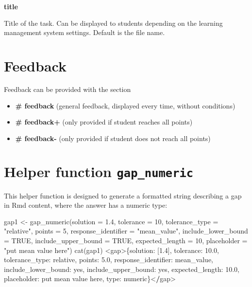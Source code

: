\documentclass[twoside]{tufte-book}
\newenvironment{Shaded}{}{}
\newcommand{\AttributeTok}[1]{\textcolor[rgb]{0.49,0.56,0.16}{#1}}
\newcommand{\ConstantTok}[1]{\textcolor[rgb]{0.53,0.00,0.00}{#1}}
\newcommand{\DecValTok}[1]{\textcolor[rgb]{0.25,0.63,0.44}{#1}}
\newcommand{\ErrorTok}[1]{\textcolor[rgb]{1.00,0.00,0.00}{\textbf{#1}}}
\newcommand{\FloatTok}[1]{\textcolor[rgb]{0.25,0.63,0.44}{#1}}
\newcommand{\FunctionTok}[1]{\textcolor[rgb]{0.02,0.16,0.49}{#1}}
\newcommand{\NormalTok}[1]{#1}
\newcommand{\OtherTok}[1]{\textcolor[rgb]{0.00,0.44,0.13}{#1}}
\newcommand{\SpecialCharTok}[1]{\textcolor[rgb]{0.25,0.44,0.63}{#1}}
\newcommand{\StringTok}[1]{\textcolor[rgb]{0.25,0.44,0.63}{#1}}
\providecommand{\tightlist}{%
  \setlength{\itemsep}{0pt}\setlength{\parskip}{0pt}}
\begin{document}
\noindent\textbf{title}\label{title-2}

Title of the task. Can be displayed to students depending on
the learning management system settings. Default is the file name.

\section{Feedback}\label{feedback-2}

Feedback can be provided with the section

\begin{itemize}
\tightlist
\item
  \textbf{\# feedback} (general feedback, displayed every time, without conditions)
\item
  \textbf{\# feedback+} (only provided if student reaches all points)
\item
  \textbf{\# feedback-} (only provided if student does not reach all points)
\end{itemize}

\section{\texorpdfstring{Helper function \texttt{gap\_numeric}}{Helper function gap\_numeric}}\label{gapnumeric}

This helper function is designed to generate a formatted string describing a gap in Rmd content, where the answer has a numeric type:

\begin{Shaded}
\begin{Highlighting}[]
\NormalTok{gap1 }\OtherTok{\textless{}{-}} \FunctionTok{gap\_numeric}\NormalTok{(}\AttributeTok{solution =} \FloatTok{1.4}\NormalTok{, }\AttributeTok{tolerance =} \DecValTok{10}\NormalTok{, }\AttributeTok{tolerance\_type =} \StringTok{"relative"}\NormalTok{,}
                    \AttributeTok{points =} \DecValTok{5}\NormalTok{, }\AttributeTok{response\_identifier =} \StringTok{"mean\_value"}\NormalTok{,}
                    \AttributeTok{include\_lower\_bound =} \ConstantTok{TRUE}\NormalTok{, }\AttributeTok{include\_upper\_bound =} \ConstantTok{TRUE}\NormalTok{,}
                    \AttributeTok{expected\_length =} \DecValTok{10}\NormalTok{, }\AttributeTok{placeholder =} \StringTok{"put mean value here"}\NormalTok{)}
\FunctionTok{cat}\NormalTok{(gap1)}
\SpecialCharTok{\textless{}}\NormalTok{gap}\SpecialCharTok{\textgreater{}}\NormalTok{\{solution}\SpecialCharTok{:}\NormalTok{ [}\FloatTok{1.4}\NormalTok{], tolerance}\SpecialCharTok{:} \FloatTok{10.0}\NormalTok{, tolerance\_type}\SpecialCharTok{:}\NormalTok{ relative, points}\SpecialCharTok{:} \FloatTok{5.0}\NormalTok{, response\_identifier}\SpecialCharTok{:}\NormalTok{ mean\_value, include\_lower\_bound}\SpecialCharTok{:}\NormalTok{ yes, include\_upper\_bound}\SpecialCharTok{:}\NormalTok{ yes, expected\_length}\SpecialCharTok{:} \FloatTok{10.0}\NormalTok{, placeholder}\SpecialCharTok{:}\NormalTok{ put mean value here, type}\SpecialCharTok{:}\NormalTok{ numeric\}}\SpecialCharTok{\textless{}}\ErrorTok{/}\NormalTok{gap}\SpecialCharTok{\textgreater{}}
\end{Highlighting}
\end{Shaded}
\end{document}
